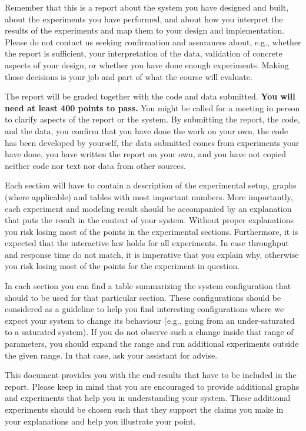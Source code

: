\documentclass[11pt,a4paper]{article}
\begin{document}
Remember that this is a report about the system you have designed and built, about the experiments you have performed, and about how you interpret the results of the experiments and map them to your design and implementation. Please do not contact us seeking confirmation and assurances about, e.g., whether the report is sufficient, your interpretation of the data, validation of concrete aspects of your design, or whether you have done enough experiments. Making those decisions is your job and part of what the course will evaluate.

The report will be graded together with the code and data submitted. \textbf{You will need at least 400 points to pass.} You might be called for a meeting in person to clarify aspects of the report or the system. By submitting the report, the code, and the data, you confirm that you have done the work on your own, the code has been developed by yourself, the data submitted comes from experiments your have done, you have written the report on your own, and you have not copied neither code nor text nor data from other sources.

Each section will have to contain a description of the experimental setup, graphs (where applicable) and tables with most important numbers. More importantly, each experiment and modeling result should be accompanied by an explanation that puts the result in the context of your system. Without proper explanations you risk losing most of the points in the experimental sections. Furthermore, it is expected that the interactive law holds for all experiments. In case throughput and response time do not match, it is imperative that you explain why, otherwise you risk losing most of the points for the experiment in question.

In each section you can find a table summarizing the system configuration that should to be used for that particular section. These configurations should be considered as a guideline to help you find interesting configurations where we expect your system to change its behaviour (e.g., going from an under-saturated to a saturated system). If you do not observe such a change inside that range of parameters, you should expand the range and run additional experiments outside the given range. In that case, ask your assistant for advise.

This document provides you with the end-results that have to be included in the report. Please keep in mind that you are encouraged to provide additional graphs and experiments that help you in understanding your system. These additional experiments should be chosen such that they support the claims you make in your explanations and help you illustrate your point.
\end{document}
